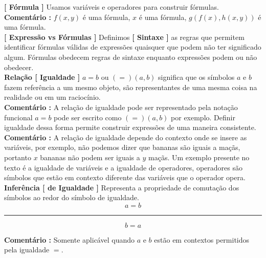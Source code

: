 \documentclass[10pt,a4paper]{report}
\begin{document}
\textbf{[ Fórmula ]} Usamos variáveis e operadores para construir fórmulas.\\

\textbf{Comentário :} $f(x,y)$ é uma fórmula, $x $ é uma fórmula, $g(f(x),h(x,y) ) $ é uma fórmula.\\

\textbf{[ Expressão vs Fórmulas ]} Definimos \textbf{[ Sintaxe ]} as regras que permitem identificar fórmulas válidas de expressões quaisquer que podem não ter significado algum. Fórmulas obedecem regras de sintaxe enquanto expressões podem ou não obedecer.\\



\textbf{Relação [ Igualdade ]} $a=b$ ou $(=)(a,b)$ significa que os símbolos $a$ e $b$ fazem referência a um mesmo objeto, são representantes de uma mesma coisa na realidade ou em um raciocínio.\\

\textbf{Comentário :} A relação de igualdade pode ser representado pela notação funcional $ a = b $ pode ser escrito como $(=)(a,b)$ por exemplo. Definir igualdade dessa forma permite construir expressões de uma maneira consistente.\\

\textbf{Comentário :} A relação de igualdade depende do contexto onde se insere as variáveis, por exemplo, não podemos dizer que bananas são iguais a maçãs, portanto $x$ bananas não podem ser iguais a $y$ maçãs. Um exemplo presente no texto é a igualdade de variáveis e a igualdade de operadores, operadores são símbolos que estão em contexto diferente das variáveis que o operador opera.\\

\textbf{Inferência [ de Igualdade ]} Representa a propriedade de comutação dos símbolos ao redor do símbolo de igualdade.
$$a=b$$
\hrule
$$b=a$$

\textbf{Comentário :} Somente aplicável quando $a$ e $b$ estão em contextos permitidos pela igualdade $=$.\\
\end{document}
